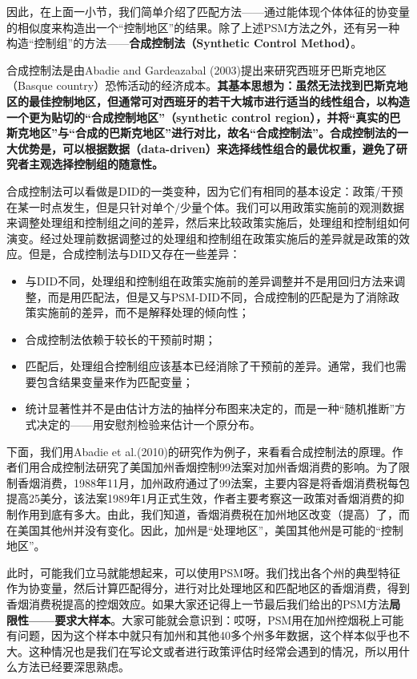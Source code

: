 \documentclass[cn,12pt,math=newtx,citestyle=gb7714-2015,bibstyle=gb7714-2015]{elegantbook}
\begin{document}
	因此，在上面一小节，我们简单介绍了匹配方法——通过能体现个体体征的协变量的相似度来构造出一个“控制地区”的结果。除了上述PSM方法之外，还有另一种构造“控制组”的方法——\textbf{合成控制法（Synthetic Control Method）}。
	
	合成控制法是由Abadie and Gardeazabal (2003)提出来研究西班牙巴斯克地区（Basque country）恐怖活动的经济成本。\textbf{其基本思想为：虽然无法找到巴斯克地区的最佳控制地区，但通常可对西班牙的若干大城市进行适当的线性组合，以构造一个更为贴切的“合成控制地区”（synthetic control region），并将“真实的巴斯克地区”与“合成的巴斯克地区”进行对比，故名“合成控制法”。合成控制法的一大优势是，可以根据数据（data-driven）来选择线性组合的最优权重，避免了研究者主观选择控制组的随意性。}
	
	合成控制法可以看做是DID的一类变种，因为它们有相同的基本设定：政策/干预在某一时点发生，但是只针对单个/少量个体。我们可以用政策实施前的观测数据来调整处理组和控制组之间的差异，然后来比较政策实施后，处理组和控制组如何演变。经过处理前数据调整过的处理组和控制组在政策实施后的差异就是政策的效应。但是，合成控制法与DID又存在一些差异：
	
	\begin{itemize}
		\item 与DID不同，处理组和控制组在政策实施前的差异调整并不是用回归方法来调整，而是用匹配法，但是又与PSM-DID不同，合成控制的匹配是为了消除政策实施前的差异，而不是解释处理的倾向性；
		\item  合成控制法依赖于较长的干预前时期；
		\item 匹配后，处理组合控制组应该基本已经消除了干预前的差异。通常，我们也需要包含结果变量来作为匹配变量；
		\item 统计显著性并不是由估计方法的抽样分布图来决定的，而是一种“随机推断”方式决定的——用安慰剂检验来估计一个原分布。
	\end{itemize}
	
	下面，我们用Abadie et al.(2010)的研究作为例子，来看看合成控制法的原理。作者们用合成控制法研究了美国加州香烟控制99法案对加州香烟消费的影响。为了限制香烟消费，1988年11月，加州政府通过了99法案，主要内容是将香烟消费税每包提高25美分，该法案1989年1月正式生效，作者主要考察这一政策对香烟消费的抑制作用到底有多大。由此，我们知道，香烟消费税在加州地区改变（提高）了，而在美国其他州并没有变化。因此，加州是“处理地区”，美国其他州是可能的“控制地区”。
	
	此时，可能我们立马就能想起来，可以使用PSM呀。我们找出各个州的典型特征作为协变量，然后计算匹配得分，进行对比处理地区和匹配地区的香烟消费，得到香烟消费税提高的控烟效应。如果大家还记得上一节最后我们给出的PSM方法\textbf{局限性——要求大样本}。大家可能就会意识到：哎呀，PSM用在加州控烟税上可能有问题，因为这个样本中就只有加州和其他40多个州多年数据，这个样本似乎也不大。这种情况也是我们在写论文或者进行政策评估时经常会遇到的情况，所以用什么方法已经要深思熟虑。
	
\end{document}
